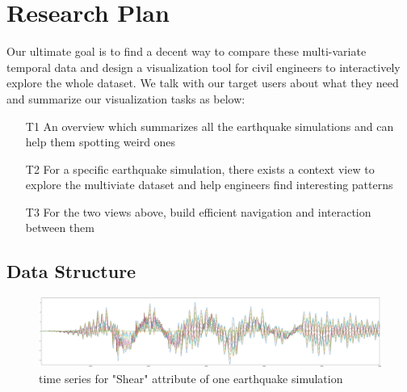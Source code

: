 \section{Research Plan} %
\label{sec:vis}

Our ultimate goal is to find a decent way to compare these multi-variate temporal data and design a visualization tool for civil engineers to interactively explore the whole dataset. We talk with our target users about what they need and summarize our visualization tasks as below:
\begin{itemize}
	\item [T1] An overview which summarizes all the earthquake simulations and can help them spotting weird ones
	\item [T2] For a specific earthquake simulation, there exists a context view to explore the multiviate dataset and help engineers  find interesting patterns 
	\item [T3] For the two views above, build efficient navigation and interaction between them 
\end{itemize} 


\subsection{Data Structure}
\label{sec:data}
\begin{figure}[h]
	\centering %
	\includegraphics[width=\columnwidth]{figs/eq} 
	\caption{time series for "Shear" attribute of one earthquake simulation}
	\label{fig:data}
\end{figure}


